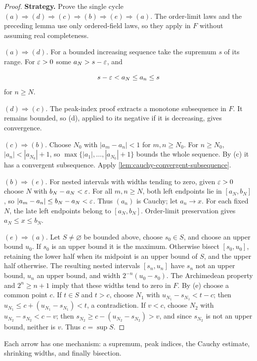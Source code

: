 \begin{proof}
\textbf{Strategy.} Prove the single cycle
$(a)\Rightarrow(d)\Rightarrow(c)\Rightarrow(b)\Rightarrow(e)\Rightarrow(a)$.
The order-limit laws and the preceding lemma use only ordered-field laws,
so they apply in $F$ without assuming real completeness.

\emph{$(a)\Rightarrow(d)$.} For a bounded increasing sequence take the
supremum $s$ of its range. For $\varepsilon>0$ some $a_N>s-\varepsilon$, and

\[
s-\varepsilon<a_N\leq a_n\leq s
\]
 for $n\geq N$.

\emph{$(d)\Rightarrow(c)$.} The peak-index proof extracts a monotone
subsequence in $F$. It remains bounded, so (d), applied to its negative
if it is decreasing, gives convergence.

\emph{$(c)\Rightarrow(b)$.} Choose $N_0$ with $|a_m-a_n|<1$ for $m,n\geq N_0$.
For $n\geq N_0$, $|a_n|<|a_{N_0}|+1$, so
$\max\{|a_1|,\ldots,|a_{N_0}|+1\}$ bounds the whole sequence.
By (c) it has a convergent subsequence. Apply
\cref{lem:cauchy-convergent-subsequence}.

\emph{$(b)\Rightarrow(e)$.} For nested intervals with widths tending to
zero, given $\varepsilon>0$ choose $N$ with $b_N-a_N<\varepsilon$.
For all $m,n\geq N$, both left endpoints lie in $[a_N,b_N]$, so
$|a_m-a_n|\leq b_N-a_N<\varepsilon$. Thus $(a_n)$ is
Cauchy; let $a_n\to x$. For each fixed $N$, the late left endpoints
belong to $[a_N,b_N]$. Order-limit preservation gives $a_N\leq x\leq b_N$.

\emph{$(e)\Rightarrow(a)$.} Let $S\ne\varnothing$ be bounded above,
choose $s_0\in S$, and choose an upper bound $u_0$. If $s_0$ is an upper
bound it is the maximum. Otherwise bisect $[s_0,u_0]$, retaining the lower
half when its midpoint is an upper bound of $S$, and the upper half otherwise.
The resulting nested intervals $[s_n,u_n]$ have $s_n$ not an upper bound,
$u_n$ an upper bound, and width $2^{-n}(u_0-s_0)$. The Archimedean property
and $2^n\geq n+1$ imply that these widths tend to zero in $F$.
By (e) choose a common point $c$. If $t\in S$ and $t>c$, choose $N_1$ with $u_{N_1}-s_{N_1}<t-c$; then
$u_{N_1}\leq c+(u_{N_1}-s_{N_1})<t$, a contradiction.
If $v<c$, choose $N_2$ with $u_{N_2}-s_{N_2}<c-v$;
then $s_{N_2}\geq c-(u_{N_2}-s_{N_2})>v$, and since
$s_{N_2}$ is not an upper bound, neither is $v$. Thus $c=\sup S$.
\end{proof}



\begin{center}
\end{center}
Each arrow has one mechanism: a supremum, peak indices, the Cauchy
estimate, shrinking widths, and finally bisection.

